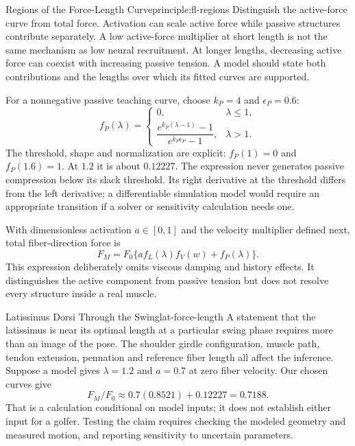 \begin{principle}{Regions of the Force-Length Curve}{principle:fl-regions}
Distinguish the active-force curve from total force. Activation can scale active force while passive structures contribute separately. A low active-force multiplier at short length is not the same mechanism as low neural recruitment. At longer lengths, decreasing active force can coexist with increasing passive tension. A model should state both contributions and the lengths over which its fitted curves are supported.
\end{principle}

For a nonnegative passive teaching curve, choose $k_P=4$ and $\epsilon_P=0.6$:
\begin{equation}
f_P(\lambda)=
\begin{cases}
0,&\lambda\leq1,\\
\dfrac{e^{k_P(\lambda-1)}-1}{e^{k_P\epsilon_P}-1},&\lambda>1.
\end{cases}
\label{eq:passive-force-length}
\end{equation}
The threshold, shape and normalization are explicit: $f_P(1)=0$ and $f_P(1.6)=1$. At $1.2$ it is about $0.12227$. The expression never generates passive compression below its slack threshold. Its right derivative at the threshold differs from the left derivative; a differentiable simulation model would require an appropriate transition if a solver or sensitivity calculation needs one.

With dimensionless activation $a\in[0,1]$ and the velocity multiplier defined next, total fiber-direction force is
\begin{equation}
F_M=F_0\{a f_L(\lambda)f_V(w)+f_P(\lambda)\}.
\label{eq:total-muscle-force}
\end{equation}
This expression deliberately omits viscous damping and history effects. It distinguishes the active component from passive tension but does not resolve every structure inside a real muscle.

\begin{example}{Latissimus Dorsi Through the Swing}{lat-force-length}
A statement that the latissimus is near its optimal length at a particular swing phase requires more than an image of the pose. The shoulder girdle configuration, muscle path, tendon extension, pennation and reference fiber length all affect the inference. Suppose a model gives $\lambda=1.2$ and $a=0.7$ at zero fiber velocity. Our chosen curves give
\[
F_M/F_0\approx0.7(0.8521)+0.12227=0.7188.
\]
 That is a calculation conditional on model inputs; it does not establish either input for a golfer. Testing the claim requires checking the modeled geometry and measured motion, and reporting sensitivity to uncertain parameters.
\end{example}

